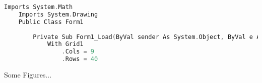 \begin{appendix}

    \begin{lstlisting}[language = C]
    Imports System.Math
    Imports System.Drawing
    Public Class Form1
    
    	Private Sub Form1_Load(ByVal sender As System.Object, ByVal e As System.EventArgs) Handles MyBase.Load
    		With Grid1
    			.Cols = 9
    			.Rows = 40
    \end{lstlisting}
\end{appendix}



\begin{appendix}

Some Figures...

\end{appendix}